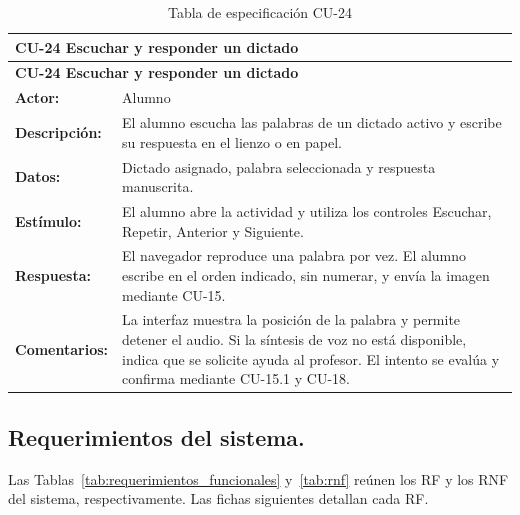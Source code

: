 \begin{longtable}{|p{3.2cm}|p{11.8cm}|}
\caption{Tabla de especificación CU-24}\label{tab:cu24} \\ \hline
\multicolumn{2}{|p{15cm}|}{\textbf{CU-24 Escuchar y responder un dictado}} \\ \hline
\endfirsthead
\hline
\multicolumn{2}{|p{15cm}|}{\textbf{CU-24 Escuchar y responder un dictado}} \\ \hline
\endhead
\textbf{Actor:} & Alumno \\ \hline
\textbf{Descripción:} & El alumno escucha las palabras de un dictado activo y escribe su respuesta en el lienzo o en papel. \\ \hline
\textbf{Datos:} & Dictado asignado, palabra seleccionada y respuesta manuscrita. \\ \hline
\textbf{Estímulo:} & El alumno abre la actividad y utiliza los controles Escuchar, Repetir, Anterior y Siguiente. \\ \hline
\textbf{Respuesta:} & El navegador reproduce una palabra por vez. El alumno escribe en el orden indicado, sin numerar, y envía la imagen mediante CU-15. \\ \hline
\textbf{Comentarios:} & La interfaz muestra la posición de la palabra y permite detener el audio. Si la síntesis de voz no está disponible, indica que se solicite ayuda al profesor. El intento se evalúa y confirma mediante CU-15.1 y CU-18. \\ \hline
\end{longtable}

\subsection{Requerimientos del sistema.}

Las Tablas~\ref{tab:requerimientos_funcionales} y~\ref{tab:rnf} reúnen los RF y los RNF del sistema, respectivamente. Las fichas siguientes detallan cada RF.
